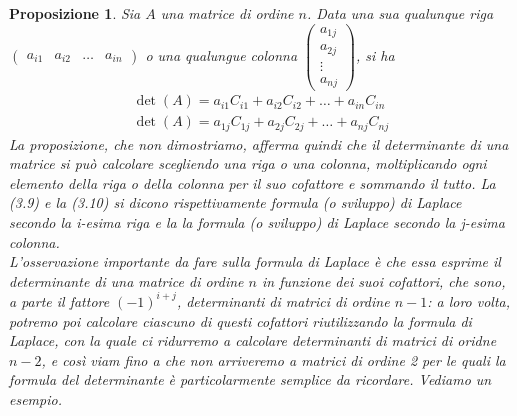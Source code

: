 \documentclass{book}
\newtheorem {proposizione}{Proposizione}
\begin{document}
\begin{proposizione}
  Sia $A$ una matrice di ordine $n$. Data una sua qualunque riga $\begin{pmatrix} a_{i1} & a_{i2} & \dots & a_{in} \end{pmatrix}$ o una qualungue colonna $\begin{pmatrix} a_{1j} \\ a_{2j} \\ \vdots \\ a_{nj} \end{pmatrix}$, si ha
  \begin{eqnarray}
    \det(A)=a_{i1}C_{i1}+a_{i2}C_{i2}+\dots+a_{in}C_{in}\\
    \det(A)=a_{1j}C_{1j}+a_{2j}C_{2j}+\dots+a_{nj}C_{nj}
  \end{eqnarray}
  La proposizione, che non dimostriamo, afferma quindi che il determinante di una matrice si può calcolare scegliendo una riga o una colonna, moltiplicando ogni elemento della riga o della colonna per il suo cofattore e sommando il tutto. La (3.9) e la (3.10) si dicono rispettivamente \textit{formula (o sviluppo) di Laplace secondo la i-esima riga e la la formula (o sviluppo) di Laplace secondo la j-esima colonna.}\\
  L'osservazione importante da fare sulla formula di Laplace è che essa esprime il determinante di una matrice di ordine $n$ in funzione dei suoi cofattori, che sono, a parte il fattore $(-1)^{i+j}$, determinanti di matrici di ordine $n-1$: a loro volta, potremo poi calcolare ciascuno di questi cofattori riutilizzando la formula di Laplace, con la quale ci ridurremo a calcolare determinanti di matrici di oridne $n - 2$, e così viam fino a che non arriveremo a matrici di ordine 2 per le quali la formula del determinante è particolarmente semplice da ricordare. Vediamo un esempio.
\end{proposizione}
\end{document}
